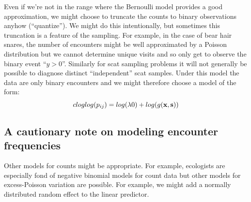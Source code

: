 Even if we're not in the range where the Bernoulli model provides a
good approximation, we might choose to truncate the counts to binary
observations anyhow (``quantize'').
We might do
this intentionally, but sometimes this truncation is a feature of the
sampling. For example, in the case of bear hair snares, the number of
encounters might be well approximated by a Poisson distribution but we
cannot determine unique visits and so only get to observe the binary
event ``$y>0$''. Similarly for scat sampling problems it will not
generally be possible to diagnose distinct ``independent'' scat
samples. Under this model the data are only binary encounters and we
might therefore choose a model of the form:
\[
 cloglog(p_{ij}) = log(\lambda0)  + log(g({\bf x},{\bf s}))
\]

\subsection{A cautionary note on modeling encounter frequencies}

Other models for counts might be appropriate. For example, ecologists
are especially fond of negative binomial models for count data
\citep{verhoef_boveng:2007,
white_bennetts:1996,kery_etal:2005}
but other models for excess-Poisson variation are possible. For
example, we might add a normally distributed random effect to
the linear predictor.

